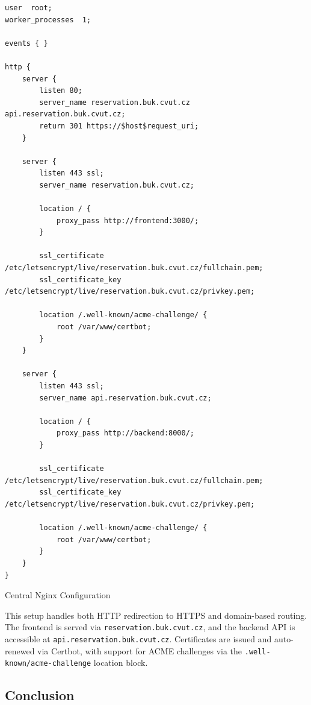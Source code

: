 \begin{listing}
  \begin{verbatim}
user  root;
worker_processes  1;

events { }

http {
    server {
        listen 80;
        server_name reservation.buk.cvut.cz api.reservation.buk.cvut.cz;
        return 301 https://$host$request_uri;
    }

    server {
        listen 443 ssl;
        server_name reservation.buk.cvut.cz;

        location / {
            proxy_pass http://frontend:3000/;
        }

        ssl_certificate /etc/letsencrypt/live/reservation.buk.cvut.cz/fullchain.pem;
        ssl_certificate_key /etc/letsencrypt/live/reservation.buk.cvut.cz/privkey.pem;

        location /.well-known/acme-challenge/ {
            root /var/www/certbot;
        }
    }

    server {
        listen 443 ssl;
        server_name api.reservation.buk.cvut.cz;

        location / {
            proxy_pass http://backend:8000/;
        }

        ssl_certificate /etc/letsencrypt/live/reservation.buk.cvut.cz/fullchain.pem;
        ssl_certificate_key /etc/letsencrypt/live/reservation.buk.cvut.cz/privkey.pem;

        location /.well-known/acme-challenge/ {
            root /var/www/certbot;
        }
    }
}
\end{verbatim}
\caption{Central Nginx Configuration}
\label{list:docker-frontend}
\end{listing}

This setup handles both HTTP redirection to HTTPS and domain-based routing. The frontend is served via \texttt{reservation.buk.cvut.cz}, and the backend API is accessible at \texttt{api.reservation.buk.cvut.cz}. Certificates are issued and auto-renewed via Certbot, with support for ACME challenges via the \texttt{.well-known/acme-challenge} location block.

\subsection{Conclusion}

